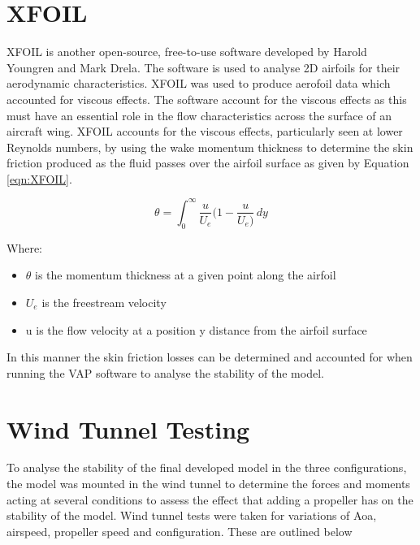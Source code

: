 



\section{XFOIL}
XFOIL is another open-source, free-to-use software developed by Harold Youngren and Mark Drela. The software is used to analyse 2D airfoils for their aerodynamic characteristics. XFOIL was used to produce aerofoil data which accounted for viscous effects. The software account for the viscous effects as this must have an essential role in the flow characteristics across the surface of an aircraft wing. XFOIL accounts for the viscous effects, particularly seen at lower Reynolds numbers, by using the wake momentum thickness to determine the skin friction produced as the fluid passes over the airfoil surface as given by Equation \ref{eqn:XFOIL}. 


\begin{equation}
    \theta = \int_{0}^{\infty} \frac{u}{U_e} ( 1 - \frac{u}{U_e) } \,dy
    \label{eqn:XFOIL}
\end{equation}

Where:
\begin{itemize}
    \item $\theta$ is the momentum thickness at a given point along the airfoil
    \item $U_e$ is the freestream velocity 
    \item u is the flow velocity at a position y distance from the airfoil surface
\end{itemize}

In this manner the skin friction losses can be determined and accounted for when running the VAP software to analyse the stability of the model. 

\section{Wind Tunnel Testing}
To analyse the stability of the final developed model in the three configurations, the model was mounted in the wind tunnel to determine the forces and moments acting at several conditions to assess the effect that adding a propeller has on the stability of the model. Wind tunnel tests were taken for variations of Aoa, airspeed, propeller speed and configuration. These are outlined below

